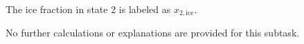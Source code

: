 The ice fraction in state 2 is labeled as \( x_{2,\text{ice}} \).  

No further calculations or explanations are provided for this subtask.